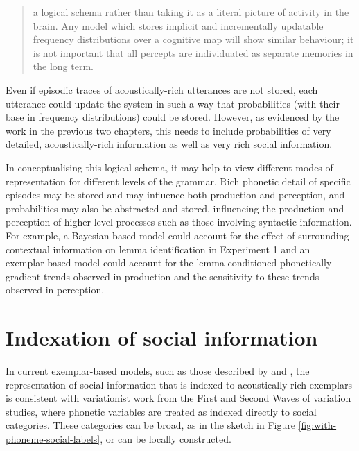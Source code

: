 \begin{quote}

a logical schema rather than taking it as a literal picture of activity in the brain.  Any model which stores implicit and incrementally updatable frequency distributions over a cognitive map will show similar behaviour; it is not important that all percepts are individuated as separate memories in the long term. \cite[113]{pierrehumbert2002}

\end{quote}

\noindent Even if episodic traces of acoustically-rich utterances are not stored, each utterance could update the system in such a way that probabilities (with their base in frequency distributions) could be stored.  However, as evidenced by the work in the previous two chapters, this needs to include probabilities of very detailed, acoustically-rich information as well as very rich social information.

	
In conceptualising this logical schema, it may help to view different modes of representation for different levels of the grammar.  Rich phonetic detail of specific episodes may be stored and may influence both production and perception, and probabilities may also be abstracted and stored, influencing the production and perception of higher-level processes such as those involving syntactic information.  For example, a Bayesian-based model could account for the effect of surrounding contextual information on lemma identification in Experiment 1 and an exemplar-based model could account for the lemma-conditioned phonetically gradient trends observed in production and the sensitivity to these trends observed in perception. 


\section{Indexation of social information}\label{sec:richmodel}

In current exemplar-based models, such as those described by  and , the representation of social information that is indexed to acoustically-rich exemplars is consistent with variationist work from the First and Second Waves of variation studies, where phonetic variables are treated as indexed directly to social categories. These categories can be broad, as in the sketch in Figure \ref{fig:with-phoneme-social-labels}, or can be locally constructed.  

